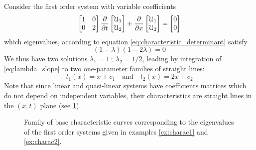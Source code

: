 \begin{example}
  \label{ex:charac2}
  Consider the first order system with variable coefficients
\begin{equation*}
 \left[\begin{matrix}1 &0 \\0 &2\end{matrix}\right] \frac{\partial }{\partial t} \left[\begin{matrix}\mathcal{U}_1 \\ \mathcal{U}_2\end{matrix}\right] + \frac{\partial }{\partial x}\left[\begin{matrix}\mathcal{U}_1 \\ \mathcal{U}_2\end{matrix}\right] = \left[\begin{matrix}0 \\0\end{matrix}\right]
\end{equation*}
which eigenvalues, according to equation \eqref{eq:characteristic_determinant} satisfy
\begin{equation*}
  (1 - \lambda )(1- 2\lambda)=0
\end{equation*}
We thus have two solutions $\lambda_1=1 \: ; \: \lambda_2=1/2$, leading by integration of \eqref{eq:lambda_slope} to two one-parameter families of straight lines:
\begin{equation*}
  t_1(x)=x+c_1  \quad \text{and} \quad t_2(x)=2x+c_2 
\end{equation*}
Note that since linear and quasi-linear systems have coefficients matrices which do not depend on independent variables, their characteristics are straight lines in the $(x,t)$ plane (see \ref{fig:exampleCharac}).  
\end{example}
\begin{figure}[h]
  \centering
  \subfloat[Example \ref{ex:charac1}: $\lambda_{1,2}=\pm 1/x$\label{subfig:curve_lines}]{} \qquad
  \subfloat[Example \ref{ex:charac2}: $\lambda_{1}=1 \:\text{and} \: \lambda_2=1/2$\label{subfig:straight_lines}]{}
  \caption{Family of base characteristic curves corresponding to the eigenvalues of the first order systems given in examples \ref{ex:charac1} and \ref{ex:charac2}.}
  \label{fig:exampleCharac}
\end{figure}

